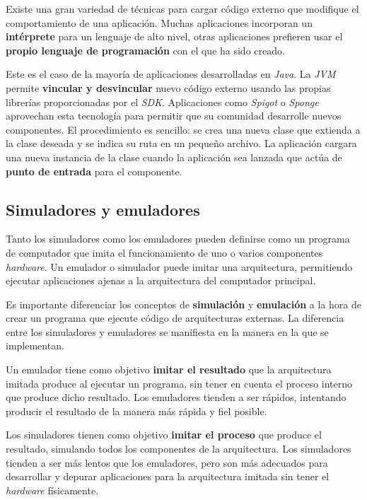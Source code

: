  Existe una gran variedad de técnicas para cargar código externo
que modifique el comportamiento de una aplicación.
Muchas aplicaciones incorporan un \textbf{intérprete} para un
lenguaje de alto nivel, otras aplicaciones prefieren usar
el \textbf{propio lenguaje de programación} con el que ha sido creado.

 Este es el caso de la mayoría de aplicaciones desarrolladas
en \textit{Java}.
La \textit{JVM} permite \textbf{vincular y desvincular} nuevo código externo
usando las propias librerías proporcionadas por el \textit{SDK}.
Aplicaciones como \textit{Spigot} o \textit{Sponge} aprovechan esta
tecnología para permitir que su comunidad desarrolle nuevos
componentes.
El procedimiento es sencillo: se crea una nueva clase que extienda a la
clase deseada y se indica su ruta en un pequeño archivo.
La aplicación cargara una nueva instancia de la clase
cuando la aplicación sea lanzada que actúa de
\textbf{punto de entrada} para el componente.

\subsection{Simuladores y emuladores}
\label{subsec:simuladores-y-emuladores}

Tanto los simuladores como los emuladores pueden definirse como un
programa de computador que imita el funcionamiento de uno o varios
componentes \textit{hardware}.
Un emulador o simulador puede imitar una arquitectura, permitiendo
ejecutar aplicaciones ajenas a la arquitectura del computador principal.

Es importante diferenciar los conceptos de \textbf{simulación}
y \textbf{emulación} a la hora de crear un programa que ejecute
código de arquitecturas externas.
La diferencia entre los simuladores y emuladores se manifiesta
en la manera en la que se implementan.

 Un emulador tiene como objetivo \textbf{imitar el resultado}
que la arquitectura imitada produce al ejecutar un programa, sin tener
en cuenta el proceso interno que produce dicho resultado.
Los emuladores tienden a ser rápidos, intentando producir el resultado
de la manera más rápida y fiel posible.

 Los simuladores tienen como objetivo \textbf{imitar el proceso}
que produce el resultado, simulando todos los componentes de la arquitectura.
Los simuladores tienden a ser más lentos que los emuladores, pero son más
adecuados para desarrollar y depurar aplicaciones para la arquitectura
imitada sin tener el \textit{hardware} físicamente.


